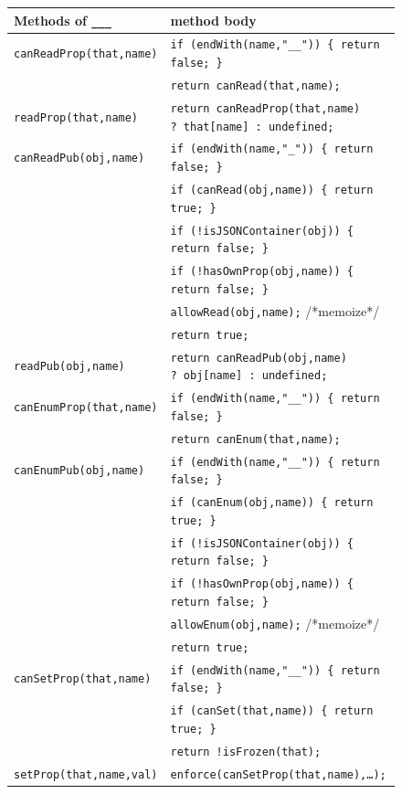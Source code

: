 \documentclass[letterpaper,twocolumn,10pt]{article}
\newcommand{\code}[1]{{\tt {#1}}}              %
\begin{document}
\begin{figure}
\begin{tabular}{ll}
  Methods of \code{\_\_\_}  & method body \\ 
  \hline 
  \code{canReadProp(that,name)}
       & \code{if (endWith(name,"\_\_"))\ \{ return false; \}} \\
       & \code{return canRead(that,name);} \\
  \code{readProp(that,name)}
       & \code{return canReadProp(that,name) ?\ that[name] :\ undefined;} \\
  \code{canReadPub(obj,name)}
       & \code{if (endWith(name,"\_"))\ \{ return false; \}} \\
       & \code{if (canRead(obj,name))\ \{ return true; \}} \\
       & \code{if (!isJSONContainer(obj))\ \{ return false; \}} \\
       & \code{if (!hasOwnProp(obj,name))\ \{ return false; \}} \\
       & \code{allowRead(obj,name);} /*memoize*/ \\
       & \code{return true;} \\
  \code{readPub(obj,name)}
       & \code{return canReadPub(obj,name) ?\ obj[name] :\ undefined;} \\
  \hline
  \code{canEnumProp(that,name)} 
       & \code{if (endWith(name,"\_\_"))\ \{ return false; \}} \\
       & \code{return canEnum(that,name);} \\
  \code{canEnumPub(obj,name)}
       & \code{if (endWith(name,"\_\_"))\ \{ return false; \}} \\
       & \code{if (canEnum(obj,name))\ \{ return true; \}} \\
       & \code{if (!isJSONContainer(obj))\ \{ return false; \}} \\
       & \code{if (!hasOwnProp(obj,name))\ \{ return false; \}} \\
       & \code{allowEnum(obj,name);} /*memoize*/ \\
       & \code{return true;} \\
  \hline
  \code{canSetProp(that,name)}
       & \code{if (endWith(name,"\_\_"))\ \{ return false; \}} \\
       & \code{if (canSet(that,name))\ \{ return true; \}} \\
       & \code{return !isFrozen(that);} \\
  \code{setProp(that,name,val)}
       & \code{enforce(canSetProp(that,name),\ldots);} \\

\end{tabular}
\end{figure}
\end{document}
